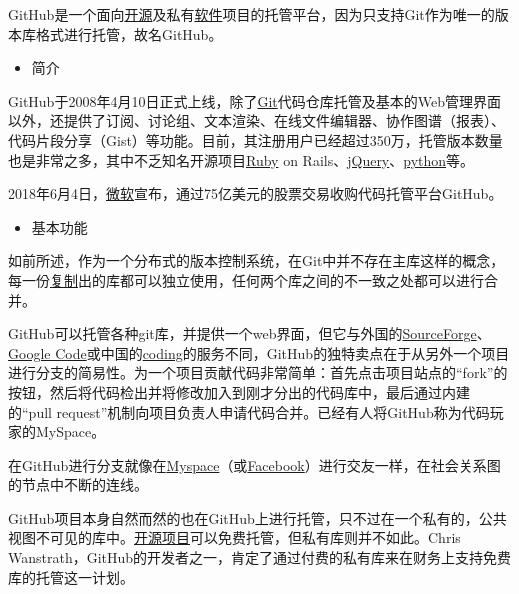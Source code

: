 \documentclass[
]{article}
\begin{document}
GitHub是一个面向\href{https://baike.baidu.com/item/开源/20720669}{开源}及私有\href{https://baike.baidu.com/item/软件/12053}{软件}项目的托管平台，因为只支持Git作为唯一的版本库格式进行托管，故名GitHub。

\begin{itemize}
\item
  简介
\end{itemize}

GitHub于2008年4月10日正式上线，除了\href{https://baike.baidu.com/item/Git/12647237}{Git}代码仓库托管及基本的Web管理界面以外，还提供了订阅、讨论组、文本渲染、在线文件编辑器、协作图谱（报表）、代码片段分享（Gist）等功能。目前，其注册用户已经超过350万，托管版本数量也是非常之多，其中不乏知名开源项目\href{https://baike.baidu.com/item/Ruby/11419}{Ruby}
on
Rails、\href{https://baike.baidu.com/item/jQuery/5385065}{jQuery}、\href{https://baike.baidu.com/item/python/407313}{python}等。

2018年6月4日，\href{https://baike.baidu.com/item/微软/124767}{微软}宣布，通过75亿美元的股票交易收购代码托管平台GitHub。

\begin{itemize}
\item
  基本功能
\end{itemize}

如前所述，作为一个分布式的版本控制系统，在Git中并不存在主库这样的概念，每一份\href{https://baike.baidu.com/item/复制}{复制}出的库都可以独立使用，任何两个库之间的不一致之处都可以进行合并。

GitHub可以托管各种git库，并提供一个web界面，但它与外国的\href{https://baike.baidu.com/item/SourceForge/6562141}{SourceForge}、\href{https://baike.baidu.com/item/Google\%20Code}{Google
Code}或中国的\href{https://baike.baidu.com/item/coding/8921246}{coding}的服务不同，GitHub的独特卖点在于从另外一个项目进行分支的简易性。为一个项目贡献代码非常简单：首先点击项目站点的``fork''的按钮，然后将代码检出并将修改加入到刚才分出的代码库中，最后通过内建的``pull
request''机制向项目负责人申请代码合并。已经有人将GitHub称为代码玩家的MySpace。

在GitHub进行分支就像在\href{https://baike.baidu.com/item/Myspace}{Myspace}（或\href{https://baike.baidu.com/item/Facebook}{Facebook}）进行交友一样，在社会关系图的节点中不断的连线。

GitHub项目本身自然而然的也在GitHub上进行托管，只不过在一个私有的，公共视图不可见的库中。\href{https://baike.baidu.com/item/开源项目}{开源项目}可以免费托管，但私有库则并不如此。Chris
Wanstrath，GitHub的开发者之一，肯定了通过付费的私有库来在财务上支持免费库的托管这一计划。
\end{document}
